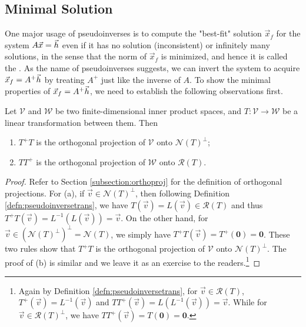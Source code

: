 \subsection{Minimal Solution}
\label{subsection:minsol}

One major usage of pseudoinverses is to compute the "best-fit" solution $\vec{x}_f$ for the system $A\vec{x} = \smash{\vec{h}}$ even if it has no solution (inconsistent) or infinitely many solutions, in the sense that the norm of $\vec{x}_f$ is minimized, and hence it is called the . As the name of pseudoinverses suggests, we can invert the system to acquire $\vec{x}_f = A^+\smash{\vec{h}}$ by treating $A^{+}$ just like the inverse of $A$. To show the minimal properties of $\vec{x}_f = A^+\smash{\vec{h}}$, we need to establish the following observations first.
\begin{proper}
\label{proper:minsollemma}
Let $\mathcal{V}$ and $\mathcal{W}$ be two finite-dimensional inner product spaces, and $T\colon \mathcal{V} \to \mathcal{W}$ be a linear transformation between them. Then
\begin{enumerate}[label=(\alph*)]
    \item $T^+ T$ is the orthogonal projection of $\mathcal{V}$ onto $\mathcal{N}(T)^\perp$;
    \item $T T^+$ is the orthogonal projection of $\mathcal{W}$ onto $\mathcal{R}(T)$.
\end{enumerate}
\end{proper}
\begin{proof}
Refer to Section \ref{subsection:orthoproj} for the definition of orthogonal projections. For (a), if $\vec{v} \in \mathcal{N}(T)^\perp$, then following Definition \ref{defn:pseudoinversetrans}, we have $T(\vec{v}) = L(\vec{v}) \in \mathcal{R}(T)$ and thus $T^+ T(\vec{v}) = L^{-1}(L(\vec{v})) = \vec{v}$. On the other hand, for $\vec{v} \in (\mathcal{N}(T)^\perp)^\perp = \mathcal{N}(T)$, we simply have $T^+ T(\vec{v}) = T^+(\textbf{0}) = \textbf{0}$. These two rules show that $T^+ T$ is the orthogonal projection of $\mathcal{V}$ onto $\mathcal{N}(T)^\perp$. The proof of (b) is similar and we leave it as an exercise to the readers.\footnote{Again by Definition \ref{defn:pseudoinversetrans}, for $\vec{v} \in \mathcal{R}(T)$, $T^+(\vec{v}) = L^{-1}(\vec{v})$ and $T T^+(\vec{v}) = L(L^{-1}(\vec{v})) = \vec{v}$. While for $\vec{v} \in \mathcal{R}(T)^\perp$, we have $T T^+(\vec{v}) = T(\textbf{0}) = \textbf{0}$.}
\end{proof} 
